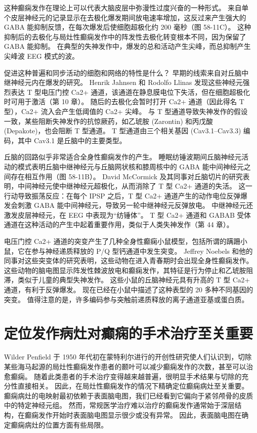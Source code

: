 这种癫痫发作在理论上可以代表大脑皮层中弥漫性过度兴奋的一种形式。 来自单个皮层神经元的记录显示在去极化爆发期间放电速率增加，这反过来产生强大的 GABA 能抑制反馈，在每次爆发后使细胞超极化约 200 毫秒（图 58-11C）。 这种抑制后的去极化与局灶性癫痫发作中的阵发性去极化转变根本不同，因为保留了 GABA 能抑制。 在典型的失神发作中，爆发的总和活动产生尖峰，而总抑制产生尖峰波 EEG 模式的波。

促进这种普遍和同步活动的细胞和网络的特性是什么？ 早期的线索来自对丘脑中继神经元内在爆发的研究。 Henrik Jahnsen 和 Rodolfo Llinas 发现这些神经元强烈表达 T 型电压门控 Ca2+ 通道，该通道在静息膜电位下失活，但在细胞超极化时可用于激活（第 10 章）。 随后的去极化会暂时打开 Ca2+ 通道（因此得名 T 型），Ca2+ 流入会产生低阈值的 Ca2+ 尖峰。 与 T 型通道导致失神发作的假设一致，某些阻断失神发作的抗惊厥药，如乙琥胺 (Zarontin) 和丙戊酸 (Depakote)，也会阻断 T 型通道。 T 型通道由三个相关基因 (Cav3.1–Cav3.3) 编码，其中 Cav3.1 是丘脑中的主要类型。

丘脑的回路似乎非常适合全身性癫痫发作的产生。 睡眠纺锤波期间丘脑神经元活动的模式表明丘脑中继神经元与丘脑网状核和膝周核中的 GABA 能中间神经元之间存在相互作用（图 58-11B）。 David McCormick 及其同事对丘脑切片的研究表明，中间神经元使中继神经元超极化，从而消除了 T 型 Ca2+ 通道的失活。 这一行动导致振荡反应：在每个 IPSP 之后，T 型 Ca2+ 通道产生的动作电位反弹爆发会刺激 GABA 能中间神经元，导致另一轮中继神经元反弹放电。 中继神经元还激发皮层神经元，在 EEG 中表现为“纺锤体”。 T 型 Ca2+ 通道和 GABAB 受体通道在这种活动的产生中起着重要作用，类似于人类失神发作（第 44 章）。

电压门控 Ca2+ 通道的突变产生了几种全身性癫痫小鼠模型，包括所谓的蹒跚小鼠，它在参与神经递质释放的 P/Q 型钙通道中发生突变。 Jeffrey Noebels 和他的同事对这些突变体的研究表明，这些动物在进入青春期时会出现全身性癫痫发作。 这些动物的脑电图显示阵发性棘波放电和癫痫发作，其特征是行为停止和乙琥胺阻滞，类似于儿童的典型失神发作。 这些小鼠的丘脑神经元具有升高的 T 型 Ca2+ 通道，有利于反弹爆发。 现在已经在小鼠中描述了这种表型的 20 多种不同基因的突变。 值得注意的是，许多编码参与突触前递质释放的离子通道亚基或蛋白质。

\section{定位发作病灶对癫痫的手术治疗至关重要}
Wilder Penfield 于 1950 年代初在蒙特利尔进行的开创性研究使人们认识到，切除某些海马起源的局灶性癫痫发作患者的颞叶可以减少癫痫发作的次数，甚至可以治愈癫痫。 随着此类患者的手术治疗变得越来越普遍，很明显手术结果与切除的充分性直接相关。 因此，在局灶性癫痫发作的情况下精确定位癫痫病灶至关重要。 癫痫病灶的电映射最初依赖于表面脑电图，我们已经看到它偏向于紧邻颅骨的皮质中的特定神经元组。 然而，常规医学治疗难以治疗的癫痫发作通常始于深层结构，在癫痫发作开始时表面脑电图显示很少或没有异常。 因此，表面脑电图在确定癫痫病灶的位置方面有些局限。

